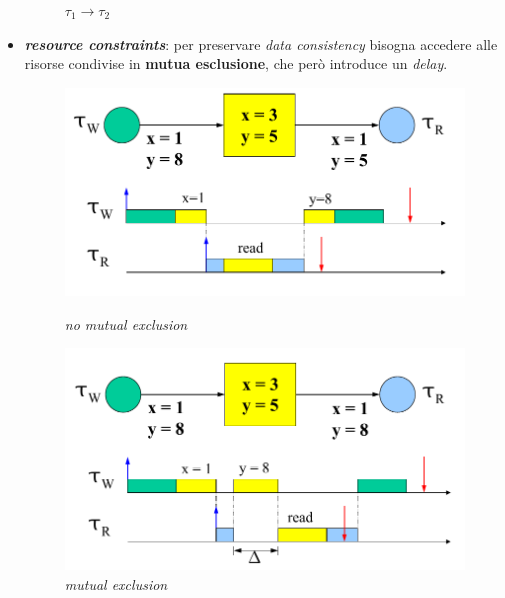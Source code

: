 \begin{itemize}
\begin{figure}[h]
\begin{minipage}[t]{0.45\textwidth}
\begin{center}
                $\tau_1 \rightarrow \tau_2$ \\
            \end{center}
        \end{minipage}
    \end{figure}
    \item \textbf{\textit{resource constraints}}: per preservare \textit{data consistency} bisogna accedere alle risorse condivise in \textbf{mutua esclusione}, che però introduce un \textit{delay}.
    \begin{figure}[h]
        \centering
        \begin{minipage}[t]{0.45\textwidth}
            \centering
            \includegraphics[width=\textwidth]{img/conc_no_me}
            \caption{\textit{no mutual exclusion}}
        \end{minipage}
        \begin{minipage}[t]{0.45\textwidth}
            \centering
            \includegraphics[width=\textwidth]{img/conc_con_me}
            \caption{\textit{mutual exclusion}}
        \end{minipage}
    \end{figure}
\end{itemize}
